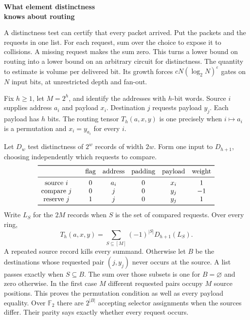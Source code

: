 \documentclass[11pt,letterpaper]{article}
\newcommand{\subhead}[1]{\par\smallskip{\noindent\large\bfseries #1\par}\vspace{-2pt}}
\newcommand{\ED}{D}
\newcommand{\Tag}{T}
\begin{document}
{\fontsize{28}{33}\selectfont\bfseries What element distinctness\\knows about routing\par}
\vspace{4pt}
A distinctness test can certify that every packet arrived. Put the packets and
the requests in one list. For each request, sum over the choice to expose it to
collisions. A missing request makes the sum zero. This turns a lower bound on
routing into a lower bound on an arbitrary circuit for distinctness. The
quantity to estimate is volume per delivered bit. Its growth forces
\(cN(\log_2 N)^\varepsilon\) gates on \(N\) input bits, at unrestricted depth
and fan-out.

\subhead{One test checks a whole delivery}
Fix \(h\ge1\), let \(M=2^h\), and identify the addresses with \(h\)-bit words.
Source \(i\) supplies address \(a_i\) and payload \(x_i\). Destination \(j\)
requests payload \(y_j\). Each payload has \(h\) bits. The routing tensor
\(\Tag_h(a,x,y)\) is one precisely when \(i\mapsto a_i\) is a permutation
and \(x_i=y_{a_i}\) for every \(i\).

Let \(\ED_w\) test distinctness of \(2^w\) records of width \(2w\). Form
one input to \(\ED_{h+1}\), choosing independently which requests to compare.
\[
\begin{array}{c@{\qquad}ccccc}
\toprule
 & \text{flag} & \text{address} & \text{padding} & \text{payload} & \text{weight}\\
\midrule
\text{source }i      & 0 & a_i & 0 & x_i & 1\\
\text{compare }j     & 0 & j   & 0 & y_j & -1\\
\text{reserve }j     & 1 & j   & 0 & y_j & 1\\
\bottomrule
\end{array}
\]
Write \(L_S\) for the \(2M\) records when \(S\) is the set of compared
requests. Over every ring,
\[
                    \Tag_h(a,x,y)=\sum_{S\subseteq [M]}(-1)^{|S|}\ED_{h+1}(L_S).
\]
A repeated source record kills every summand. Otherwise let \(B\) be the
destinations whose requested pair \((j,y_j)\) never occurs at the source.
A list passes exactly when \(S\subseteq B\). The sum over those subsets is
one for \(B=\varnothing\) and zero otherwise. In the first case \(M\)
different requested pairs occupy \(M\) source positions. This proves the
permutation condition as well as every payload equality. Over \(\mathbb F_2\)
there are \(2^{|B|}\) accepting selector assignments when the sources differ.
Their parity says exactly whether every request occurs.
\end{document}
